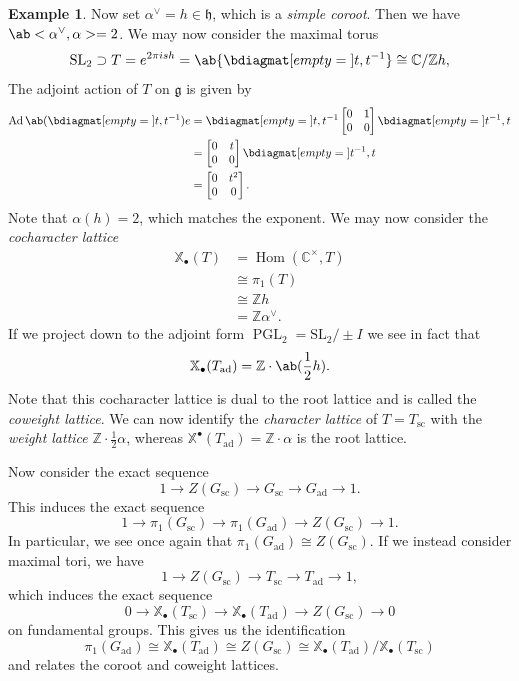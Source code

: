 \documentclass{amsart}
\theoremstyle{definition}
\newtheorem{exm}[thm]{Example}
\theoremstyle{remark}
\theoremstyle{plain}
\theoremstyle{definition}
\theoremstyle{remark}
\newcommand{\C}{\mathbb{C}}
\newcommand{\Z}{\mathbb{Z}}
\newcommand{\X}{\mathbb{X}}
\newcommand{\g}{\mathfrak{g}}
\newcommand{\h}{\mathfrak{h}}
\newcommand{\mr}[1]{\mathrm{#1}}
\newcommand{\on}[1]{\operatorname{#1}}
\newcommand{\1}{\mathbf{1}}
\newcommand{\2}{\mathbf{2}}
\newcommand{\3}{\mathbf{3}}
\newcommand{\SL}{\mr{SL}}
\DeclareMathOperator{\Hom}{Hom}
\DeclareMathOperator{\ad}{ad}
\DeclareMathOperator{\Ad}{Ad}
\begin{document}
\begin{exm}
    Now set $\alpha^{\vee} = h \in \h$, which is a \textit{simple coroot}. Then we have $\ab<\alpha^{\vee}, \alpha> = 2$. We may now consider the maximal torus
    \[ \SL_2 \supset T = e^{2 \pi i s h} = \ab\{ \bdiagmat[empty={}]{t,t^{-1}} \} \cong \C / \Z h, \]
    The adjoint action of \(T\) on \(\g\) is given by
    \begin{align*}
        \Ad \ab(\bdiagmat[empty={}]{t,t^{-1}}) e &= \bdiagmat[empty={}]{t,t^{-1}} \begin{bmatrix}
            0 & 1 \\
            0 & 0
        \end{bmatrix} \bdiagmat[empty={}]{t^{-1},t} \\
        &= \begin{bmatrix}
            0 & t \\
            0 & 0
        \end{bmatrix} \bdiagmat[empty={}]{t^{-1},t} \\
        &= \begin{bmatrix}
            0 & t^2 \\
            0 & 0
        \end{bmatrix}.
    \end{align*}
    Note that \(\alpha (h) = 2\), which matches the exponent. We may now consider the \textit{cocharacter lattice}
    \begin{align*}
        \X_{\bullet}(T) &= \Hom(\C^{\times}, T) \\
        &\cong \pi_1 (T) \\
        & \cong \Z h \\
        &= \Z \alpha^{\vee}.
    \end{align*}
    If we project down to the adjoint form \(\on{PGL}_2 = \SL_2 / \pm I\) we see in fact that
    \[ \X_{\bullet} (T_{\ad}) = \Z \cdot \ab(\frac{1}{2} h). \]
    Note that this cocharacter lattice is dual to the root lattice and is called the \textit{coweight lattice}. We can now identify the \textit{character lattice} of \(T = T_{\on{sc}}\) with the \textit{weight lattice} $\Z \cdot \frac{1}{2} \alpha$, whereas $\X^{\bullet}(T_{\ad}) = \Z \cdot \alpha$ is the root lattice.
\end{exm}

Now consider the exact sequence
\[ 1 \to Z(G_{\on{sc}}) \to G_{\on{sc}} \to G_{\ad} \to 1. \]
This induces the exact sequence
\[ 1 \to \pi_1(G_{\on{sc}}) \to \pi_1(G_{\ad}) \to Z(G_{\on{sc}}) \to 1. \]
In particular, we see once again that $\pi_1(G_{\ad}) \cong Z(G_{\on{sc}})$. If we instead consider maximal tori, we have
\[ 1 \to Z(G_{\on{sc}}) \to T_{\on{sc}} \to T_{\ad} \to 1, \]
which induces the exact sequence
\[ 0 \to \X_{\bullet}(T_{\on{sc}}) \to \X_{\bullet}(T_{\ad}) \to Z(G_{\on{sc}}) \to 0 \]
on fundamental groups. This gives us the identification
\[ \pi_1(G_{\ad}) \cong \X_{\bullet}(T_{\ad}) \cong Z(G_{\on{sc}}) \cong \X_{\bullet}(T_{\ad}) / \X_{\bullet}(T_{\on{sc}}) \]
and relates the coroot and coweight lattices.
\end{document}

